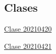 \documentclass[../main.tex]{subfiles}
\begin{document}
\subsection{Clases}

\href{https://youtu.be/uFFbE31PpaQ}{Clase 20210420}

\href{https://youtu.be/L-XNmx4LBRA}{Clase 20210421}
\end{document}
